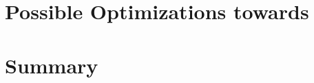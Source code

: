 \documentclass[journal,12pt,onecolumn,draftclsnofoot]{IEEEtran}
\begin{document}
\section{Possible Optimizations towards \summa}
\label{sec:opt}

\section{Summary}
%





\begin{comment}
\appendix
\newpage
\section{XXXXXX}
\label{sec:appendix_tilesize}

\end{comment}



\end{document}
